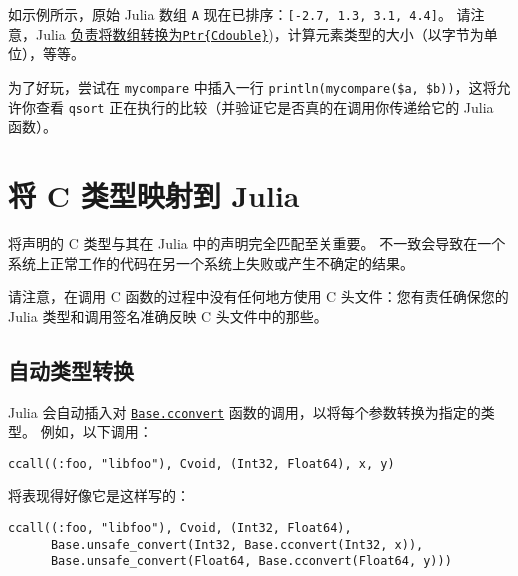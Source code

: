 如示例所示，原始 Julia 数组 \texttt{A} 现在已排序：\texttt{[-2.7, 1.3, 3.1, 4.4]}。 请注意，Julia \hyperlink{3709811402862932682}{负责将数组转换为\texttt{Ptr\{Cdouble\}}})，计算元素类型的大小（以字节为单位），等等。



为了好玩，尝试在 \texttt{mycompare} 中插入一行 \texttt{println({\textquotedbl}mycompare(\$a, \$b){\textquotedbl})}，这将允许你查看 \texttt{qsort} 正在执行的比较（并验证它是否真的在调用你传递给它的 Julia 函数）。



\hypertarget{10747596823753409973}{}


\section{将 C 类型映射到 Julia}



将声明的 C 类型与其在 Julia 中的声明完全匹配至关重要。 不一致会导致在一个系统上正常工作的代码在另一个系统上失败或产生不确定的结果。



请注意，在调用 C 函数的过程中没有任何地方使用 C 头文件：您有责任确保您的 Julia 类型和调用签名准确反映 C 头文件中的那些。\footnotemark[2]



\hypertarget{15689505875890763631}{}


\subsection{自动类型转换}



Julia 会自动插入对 \hyperlink{16487788729383051927}{\texttt{Base.cconvert}} 函数的调用，以将每个参数转换为指定的类型。 例如，以下调用：




\begin{verbatim}
ccall((:foo, "libfoo"), Cvoid, (Int32, Float64), x, y)
\end{verbatim}



将表现得好像它是这样写的：




\begin{verbatim}
ccall((:foo, "libfoo"), Cvoid, (Int32, Float64),
      Base.unsafe_convert(Int32, Base.cconvert(Int32, x)),
      Base.unsafe_convert(Float64, Base.cconvert(Float64, y)))
\end{verbatim}



